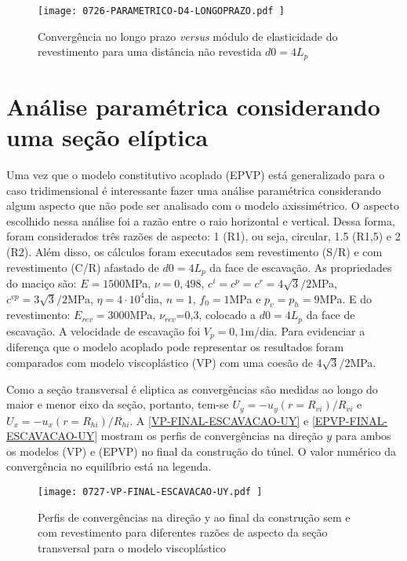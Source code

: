 \begin{figure}[H]
	\begin{center}
		\texttt{[image: 0726-PARAMETRICO-D4-LONGOPRAZO.pdf
		]}
	\end{center}
	\caption{\label{PARAMETRICO-D4-LONGOPRAZO}Convergência no longo prazo \textit{versus} módulo de elasticidade do revestimento para uma distância não revestida $d0=4L_p$}
\end{figure}

\section{Análise paramétrica considerando uma seção elíptica}

Uma vez que o modelo constitutivo acoplado (EPVP) está generalizado para o caso tridimensional é interessante fazer uma análise paramétrica considerando algum aspecto que não pode ser analisado com o modelo axissimétrico. O aspecto escolhido nessa análise foi a razão entre o raio horizontal e vertical. Dessa forma, foram considerados três razões de aspecto: 1 (R1), ou seja, circular, 1.5 (R1,5) e 2 (R2). Além disso, os cálculos foram executados sem revestimento (S/R) e com revestimento (C/R) afastado de $d0=4L_p$ da face de escavação. As propriedades do maciço são: $E=1500$MPa, $\nu=0,498$, $c^i=c^p=c^r =4\sqrt{3}/2$MPa, $c^{vp}=3\sqrt{3}/2$MPa, $\eta = 4 \cdot 10^4$dia, $n=1$, $f_0=1$MPa e $p_v=p_h=9$MPa. E do revestimento: $E_{rev}=3000$MPa, $\nu_{rev}$=0,3, colocado a $d0=4L_p$ da face de escavação. A velocidade de escavação foi $V_p=0,1$m/dia. Para evidenciar a diferença que o modelo acoplado pode representar os resultados foram comparados com modelo viscoplástico (VP) com uma coesão de $4\sqrt{3}/2$MPa.

Como a seção transversal é eliptica as convergências são medidas ao longo do maior e menor eixo da seção, portanto,  tem-se $U_y = -u_y(r=R_{vi})/R_{vi}$ e $U_x = -u_x(r=R_{hi})/R_{hi}$. A \autoref{VP-FINAL-ESCAVACAO-UY} e \autoref{EPVP-FINAL-ESCAVACAO-UY} mostram os perfis de convergências na direção $y$ para ambos os modelos (VP) e (EPVP) no final da construção do túnel. O valor numérico da convergência no equilíbrio está na legenda.

\begin{figure}[H]
	\begin{center}
		\texttt{[image: 0727-VP-FINAL-ESCAVACAO-UY.pdf
		]}
	\end{center}
	\caption{\label{VP-FINAL-ESCAVACAO-UY}Perfis de convergências na direção y ao final da construção sem e com revestimento para diferentes razões de aspecto da seção transversal para o modelo viscoplástico}
\end{figure}

